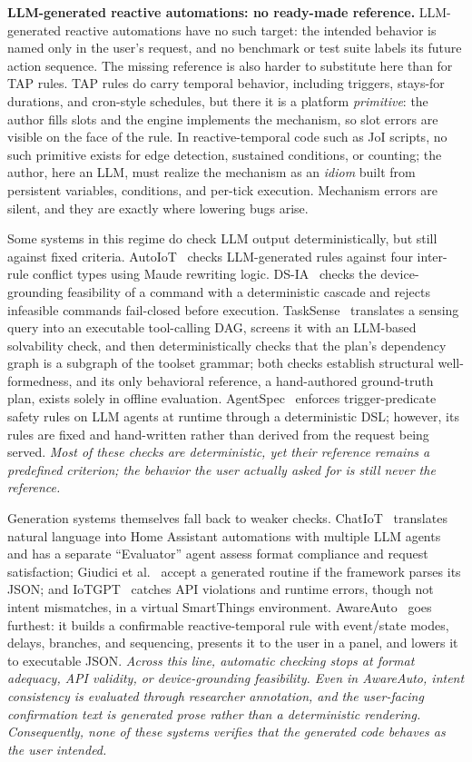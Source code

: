 \documentclass[sigconf,nonacm,anonymous,review]{acmart}
\begin{document}
\textbf{LLM-generated reactive automations: no ready-made reference.} LLM-generated reactive automations have no such target: the intended behavior is named only in the user's request, and no benchmark or test suite labels its future action sequence. The missing reference is also harder to substitute here than for TAP rules. TAP rules do carry temporal behavior, including triggers, stays-for durations, and cron-style schedules, but there it is a platform \emph{primitive}: the author fills slots and the engine implements the mechanism, so slot errors are visible on the face of the rule. In reactive-temporal code such as JoI scripts, no such primitive exists for edge detection, sustained conditions, or counting; the author, here an LLM, must realize the mechanism as an \emph{idiom} built from persistent variables, conditions, and per-tick execution. Mechanism errors are silent, and they are exactly where lowering bugs arise.

Some systems in this regime do check LLM output deterministically, but still against fixed criteria. AutoIoT~\cite{autoiot_maude} checks LLM-generated rules against four inter-rule conflict types using Maude rewriting logic. DS-IA~\cite{dsia} checks the device-grounding feasibility of a command with a deterministic cascade and rejects infeasible commands fail-closed before execution. TaskSense~\cite{tasksense} translates a sensing query into an executable tool-calling DAG, screens it with an LLM-based solvability check, and then deterministically checks that the plan's dependency graph is a subgraph of the toolset grammar; both checks establish structural well-formedness, and its only behavioral reference, a hand-authored ground-truth plan, exists solely in offline evaluation. AgentSpec~\cite{agentspec} enforces trigger-predicate safety rules on LLM agents at runtime through a deterministic DSL; however, its rules are fixed and hand-written rather than derived from the request being served. \emph{Most of these checks are deterministic, yet their reference remains a predefined criterion; the behavior the user actually asked for is still never the reference.}

Generation systems themselves fall back to weaker checks. ChatIoT~\cite{chatiot} translates natural language into Home Assistant automations with multiple LLM agents and has a separate ``Evaluator'' agent assess format compliance and request satisfaction; Giudici et al.~\cite{giudici2025} accept a generated routine if the framework parses its JSON; and IoTGPT~\cite{iotgpt} catches API violations and runtime errors, though not intent mismatches, in a virtual SmartThings environment. AwareAuto~\cite{awareauto} goes furthest: it builds a confirmable reactive-temporal rule with event/state modes, delays, branches, and sequencing, presents it to the user in a panel, and lowers it to executable JSON. \emph{Across this line, automatic checking stops at format adequacy, API validity, or device-grounding feasibility. Even in AwareAuto, intent consistency is evaluated through researcher annotation, and the user-facing confirmation text is generated prose rather than a deterministic rendering. Consequently, none of these systems verifies that the generated code behaves as the user intended.}
\end{document}
